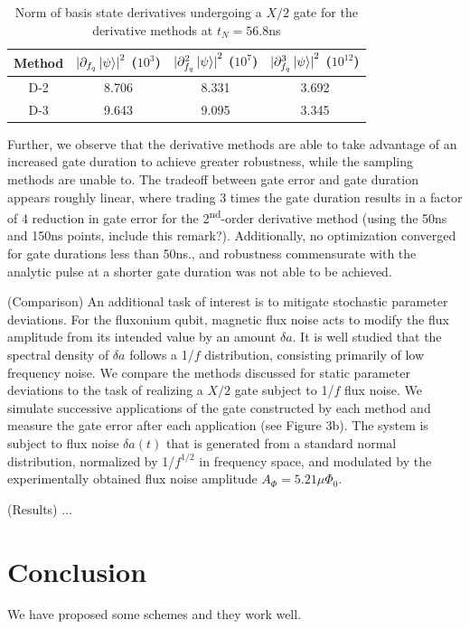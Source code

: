 \documentclass[
  amsfonts,
  amsmath,
  tbtags,
  amssymb,
  aps,
  nobibnotes,
  twocolumn,
  superscriptaddress,
]{revtex4-2}
\begin{document}
\begin{table}
  \begin{tabular}{c | c | c | c}
    Method & ${\lvert \partial_{f_{q}} \ket{\psi} \rvert}^{2}$ ($10^{3}$)
    & ${\lvert \partial^{2}_{f_{q}} \ket{\psi} \rvert}^{2}$ ($10^{7}$)
    & ${\lvert \partial^{3}_{f_{q}} \ket{\psi} \rvert}^{2}$ ($10^{12}$)\\
    \hline
    D-2 & 8.706 & 8.331 & 3.692\\
    D-3 & 9.643 & 9.095 & 3.345\\
  \end{tabular}
  \caption{Norm of basis state derivatives undergoing a $X/2$ gate for the derivative methods at $t_{N} = 56.8$ns}
\end{table}

Further, we observe that the derivative methods are able
to take advantage of an increased gate duration to achieve greater robustness,
while the sampling methods are unable to. The tradeoff between gate error and
gate duration appears roughly linear, where trading 3 times the gate duration
results in a factor of 4 reduction in gate error for the 2\textsuperscript{nd}-order
derivative method (using the 50ns and 150ns points, include this remark?). Additionally,
no optimization converged for gate durations less than 50ns., and robustness commensurate
with the analytic pulse at a shorter gate duration was not able to be achieved.


(Comparison) An additional task of interest is to mitigate
stochastic parameter deviations. For the fluxonium qubit, magnetic flux noise
acts to modify the flux amplitude from its intended value by an amount $\delta a$.
It is well studied that the spectral density of $\delta a$ follows a
1/$f$ distribution, consisting primarily of low frequency noise. We compare
the methods discussed for static parameter deviations to the task of
realizing a $X/2$ gate subject to 1/$f$ flux noise. We simulate successive
applications of the gate constructed by each method and measure the gate error
after each application (see Figure 3b). The system is subject to flux noise
$\delta a (t)$ that is generated from a standard normal distribution, normalized
by 1/$f^{1/2}$ in frequency space, and modulated by the experimentally obtained
flux noise amplitude $A_{\Phi} = 5.21 \mu \Phi_{0}$.

(Results) ...


\section{Conclusion}
We have proposed some schemes and they work well.
\end{document}
